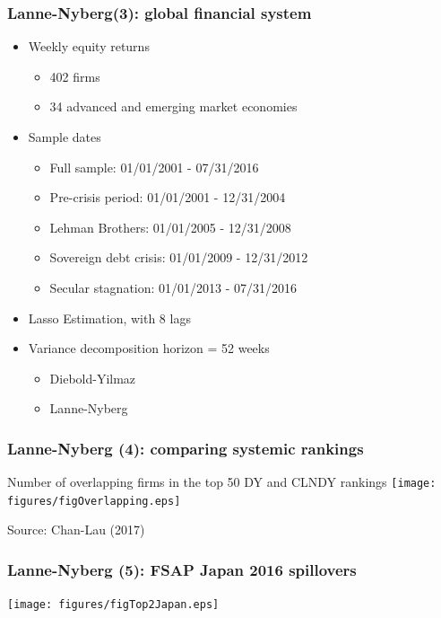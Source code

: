 \documentclass[aspectratio=43,dvipsnames,usenames, svgnames]{beamer}
\begin{document}
\begin{frame} %
\frametitle{Lanne-Nyberg(3): global financial system}
	\begin{itemize}
		\item Weekly equity returns 
			\begin{itemize}
				\item 402 firms
				\item 34 advanced and emerging market economies
			\end{itemize}
		\smallskip
		\item Sample dates
			\begin{itemize}
				\item Full sample: 01/01/2001 - 07/31/2016
				\item Pre-crisis period: 01/01/2001 - 12/31/2004
				\item Lehman Brothers: 01/01/2005 - 12/31/2008
				\item Sovereign debt crisis: 01/01/2009 - 12/31/2012
				\item Secular stagnation: 01/01/2013 - 07/31/2016
			\end{itemize}
		\smallskip
		\item Lasso Estimation, with 8 lags
		\smallskip
		\item Variance decomposition horizon = 52 weeks	
			\begin{itemize}
				\item Diebold-Yilmaz
				\item Lanne-Nyberg
			\end{itemize}
	\end{itemize}
\end{frame}

\begin{frame} %
\frametitle{Lanne-Nyberg (4): comparing systemic rankings}
	\begin{center}
		Number of overlapping firms in the top 50 DY and CLNDY rankings
		\texttt{[image: figures/figOverlapping.eps]}
	\end{center}
	\tiny{Source: Chan-Lau (2017)}
\end{frame}

\begin{frame} %
\frametitle{Lanne-Nyberg (5): FSAP Japan 2016 spillovers}
\begin{center}
	\texttt{[image: figures/figTop2Japan.eps]}
\end{center}
\end{frame}
\end{document}

